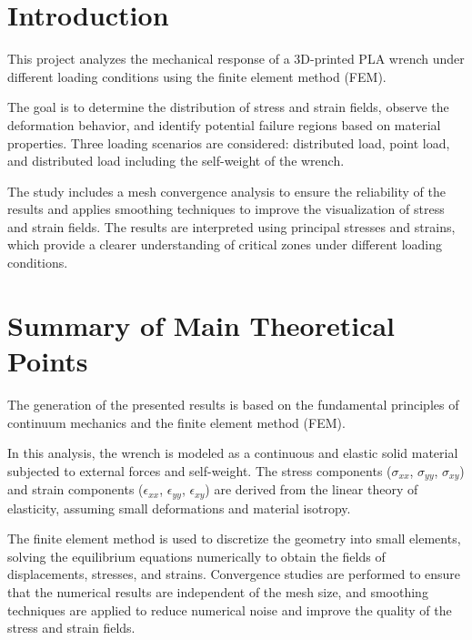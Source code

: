\documentclass[12pt]{article}
\begin{document}
\thispagestyle{empty}
\newpage
{}
\setcounter{page}{1}

\section{Introduction}

This project analyzes the mechanical response of a 3D-printed PLA wrench under different loading conditions using the finite element method (FEM).

The goal is to determine the distribution of stress and strain fields, observe the deformation behavior, and identify potential failure regions based on material properties.  
Three loading scenarios are considered: distributed load, point load, and distributed load including the self-weight of the wrench.

The study includes a mesh convergence analysis to ensure the reliability of the results and applies smoothing techniques to improve the visualization of stress and strain fields.  
The results are interpreted using principal stresses and strains, which provide a clearer understanding of critical zones under different loading conditions.


\section{Summary of Main Theoretical Points}

The generation of the presented results is based on the fundamental principles of continuum mechanics and the finite element method (FEM).

In this analysis, the wrench is modeled as a continuous and elastic solid material subjected to external forces and self-weight.  
The stress components ($\sigma_{xx}$, $\sigma_{yy}$, $\sigma_{xy}$) and strain components ($\epsilon_{xx}$, $\epsilon_{yy}$, $\epsilon_{xy}$) are derived from the linear theory of elasticity, assuming small deformations and material isotropy.

The finite element method is used to discretize the geometry into small elements, solving the equilibrium equations numerically to obtain the fields of displacements, stresses, and strains.  
Convergence studies are performed to ensure that the numerical results are independent of the mesh size, and smoothing techniques are applied to reduce numerical noise and improve the quality of the stress and strain fields.
\end{document}
